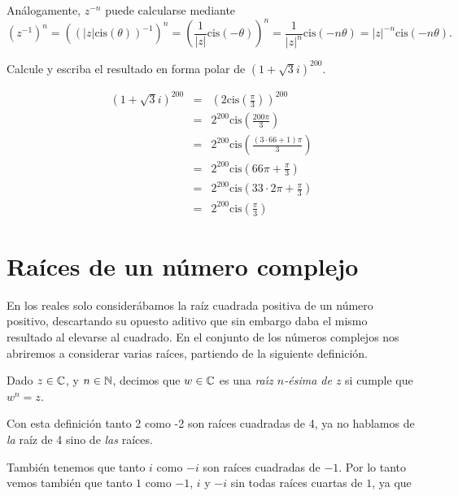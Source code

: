 \medskip 


Análogamente, $z^{-n}$ puede calcularse mediante
\[
    \left(z^{-1}\right)^n = 
    \left(\left( |z| \mbox{cis}(\theta) \right)^{-1}\right)^n
    = \left(\frac{1}{|z|} \mbox{cis}(- \theta)\right)^n
    = \frac{1}{|z|^n} \mbox{cis}(- n \theta)=|z|^{-n} \mbox{cis}(- n \theta).
\]


\begin{ejercicio}{}{}
    Calcule y escriba el resultado en forma polar de $(1+\sqrt{3} i)^{200}$.
    
\begin{eqnarray*}
(1+\sqrt{3} i)^{200} &=& \left(2 \mbox{cis}\left(\frac \pi 3\right)\right)^{200}\\
            &=& 2^{200} \mbox{cis}\left(\frac{200\pi}{3}\right)\\
            &=& 2^{200}\mbox{cis}\left(\frac{(3\cdot 66 + 1) \pi}{3}\right)\\
                &=& 2^{200}\mbox{cis}\left(66 \pi + \frac{\pi}{3}\right)\\
                &=& 2^{200}\mbox{cis}\left(33\cdot 2 \pi + \frac{\pi}{3}\right)\\
                &=& 2^{200}\mbox{cis}\left(\frac{\pi}{3}\right)
\end{eqnarray*}
\end{ejercicio}

\section{Ra\'ices de un número complejo}


En los reales solo considerábamos la raíz cuadrada positiva de un número positivo, descartando su opuesto aditivo que sin embargo daba el mismo resultado al elevarse al cuadrado. 
En el conjunto de los números complejos nos abriremos a considerar varias raíces, partiendo de la siguiente definición.

\begin{defn}{}{}
Dado $z \in \mathbb{C}$, y $n \in \mathbb{N}$, decimos que $w\in\mathbb{C}$ es una  {\em ra\'{\i}z $n$-\'esima de $z$}
si cumple que $w^n = z$.
\end{defn}


Con esta definición tanto 2 como -2 son raíces cuadradas de 4, ya no hablamos de \emph{la} raíz de 4 sino de \emph{las} raíces.


También tenemos que tanto $i$ como $-i$ son raíces cuadradas de $-1$.
Por lo tanto vemos también que tanto $1$ como $-1$, $i$ y $-i$ sin todas raíces cuartas de $1$, ya que 

